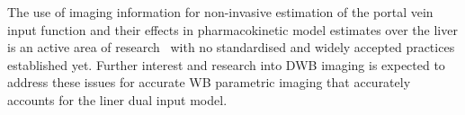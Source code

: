 The use of imaging information for non-invasive estimation of the portal vein input function and their effects in pharmacokinetic model estimates over the liver is an active area of research~\cite{Wang2018,HernandezLozano2019,Wang2021} with no standardised and widely accepted practices established yet. Further interest and research into DWB imaging is expected to address these issues for accurate WB parametric imaging that accurately accounts for the liner dual input model.  


